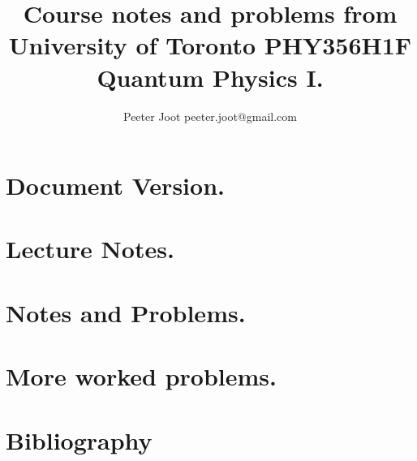 \documentclass[12pt,leqno]{book}
\begin{document}

\title{Course notes and problems from\\University of Toronto PHY356H1F\\Quantum Physics I.}
\author{Peeter Joot \quad peeter.joot@gmail.com}

\maketitle

\clearpage{}
\tableofcontents

\clearpage{}


\pagestyle{plain}




\part{Document Version.}


\part{Lecture Notes.}


\part{Notes and Problems.}














%

\part{More worked problems.}








%
\part{Bibliography}




\end{document}
